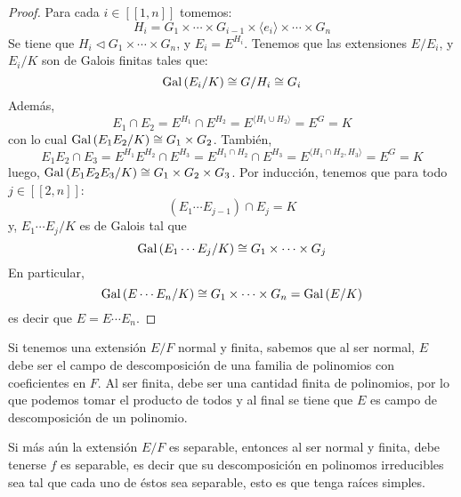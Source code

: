 \documentclass[12pt]{report}
\theoremstyle{largebreak}
\newcommand\natint[1]{\ensuremath{\left[\!\left[ #1\right]\!\right]}}
\begin{document}
    \begin{proof}
        Para cada $i\in\natint{1,n}$ tomemos:
        \begin{equation*}
            H_i=G_1\times\cdots\times G_{ i-1}\times\langle e_i\rangle\times\cdots\times G_n
        \end{equation*}
        Se tiene que $H_i\vartriangleleft G_1\times\cdots\times G_n$, y $E_i=E^{ H_i}$. Tenemos que las extensiones $E/E_i$, y $E_i/K$ son de Galois finitas tales que:
        \begin{equation*}
            \textup{Gal}\left(E_i/K\right)\cong G/H_i\cong G_i
        \end{equation*}
        Además,
        \begin{equation*}
            E_1\cap E_2=E^{ H_1}\cap E^{ H_2}=E^{\langle H_1\cup H_2\rangle}=E^G=K
        \end{equation*}
        con lo cual $\textup{Gal}\left(E_1E_2/K\right)\cong G_1\times G_2$. También,
        \begin{equation*}
            E_1E_2\cap E_3=E^{ H_1}E^{ H_2}\cap E^{ H_3}=E^{ H_1\cap H_2}\cap E^{ H_3}=E^{\langle H_1\cap H_2,H_3 \rangle}=E^G=K
        \end{equation*}
        luego, $\textup{Gal}\left(E_1E_2E_3/K\right)\cong G_1\times G_2\times G_3$. Por inducción, tenemos que para todo $j\in\natint{2,n}$:
        \begin{equation*}
            (E_1\cdots E_{ j-1})\cap E_j=K
        \end{equation*}
        y, $E_1\cdots E_j/K$ es de Galois tal que
        \begin{equation*}
            \textup{Gal}\left(E_1\cdots E_j/K\right)\cong G_1\times\cdots\times G_j
        \end{equation*}
        En particular,
        \begin{equation*}
            \textup{Gal}\left(E\cdots E_n/K\right)\cong G_1\times\cdots\times G_n=\textup{Gal}\left(E/K\right)
        \end{equation*}
        es decir que $E=E\cdots E_n$.
    \end{proof}

    Si tenemos una extensión $E/F$ normal y finita, sabemos que al ser normal, $E$ debe ser el campo de descomposición de una familia de polinomios con coeficientes en $F$. Al ser finita, debe ser una cantidad finita de polinomios, por lo que podemos tomar el producto de todos y al final se tiene que $E$ es campo de descomposición de un polinomio.

    Si más aún la extensión $E/F$ es separable, entonces al ser normal y finita, debe tenerse $f$ es separable, es decir que su descomposición en polinomos irreducibles sea tal que cada uno de éstos sea separable, esto es que tenga raíces simples.
\end{document}
